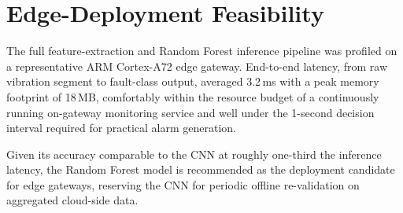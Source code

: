 \section{Edge-Deployment Feasibility}
The full feature-extraction and Random Forest inference pipeline was profiled on a representative
ARM Cortex-A72 edge gateway. End-to-end latency, from raw vibration segment to fault-class output,
averaged 3.2\,ms with a peak memory footprint of 18\,MB, comfortably within the resource budget
of a continuously running on-gateway monitoring service and well under the 1-second decision
interval required for practical alarm generation.

\begin{tcolorbox}[keybox,title={Practical Implication}]
Given its accuracy comparable to the CNN at roughly one-third the inference latency, the Random
Forest model is recommended as the deployment candidate for edge gateways, reserving the CNN for
periodic offline re-validation on aggregated cloud-side data.
\end{tcolorbox}

